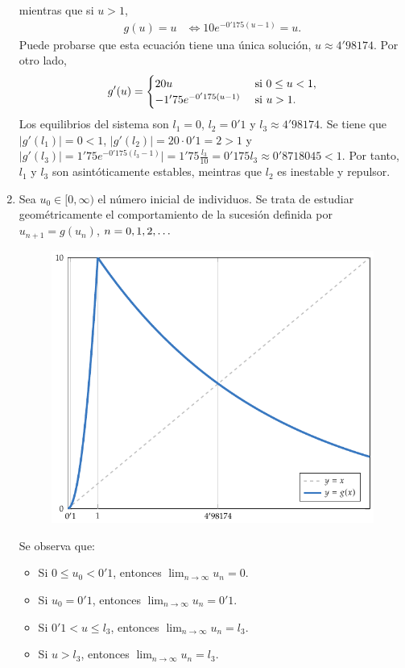 \documentclass[11pt]{report}
\begin{document}
\begin{solution}
\begin{enumerate}
        mientras que si $u > 1$,
        \begin{align*}
            g(u) = u &\iff 10e^{-0'175(u-1)} = u.
        \end{align*}
        Puede probarse que esta ecuación tiene una única solución, $u \approx 4'98174$. Por otro lado,
        \[g'(u) = \begin{cases}
            20u & $ si $ 0 \leq u < 1, \\
            -1'75e^{-0'175(u-1)} & $ si $ u > 1.
        \end{cases}\]
        Los equilibrios del sistema son $l_1 = 0$, $l_2 = 0'1$ y $l_3 \approx 4'98174$. Se tiene que $|g'(l_1)| = 0 < 1$, $|g'(l_2)| = 20\cdot 0'1 = 2 > 1$ y $|g'(l_3)| = 1'75e^{-0'175(l_3-1)}| = 1'75\frac{l_3}{10} = 0'175l_3 \approx 0'8718045 < 1$. Por tanto, $l_1$ y $l_3$ son asintóticamente estables, meintras que $l_2$ es inestable y repulsor.
        \item Sea $u_0 \in [0,\infty)$ el número inicial de individuos. Se trata de estudiar geométricamente el comportamiento de la sucesión definida por $u_{n+1} = g(u_n)$, $n = 0,1,2,\mathellipsis$
        \begin{figure}[H]
            \centering
            \includegraphics{./plot5/main.pdf}
        \end{figure}
        Se observa que:
        \begin{itemize}
            \item Si $0 \leq u_0 < 0'1$, entonces $\lim_{n\to\infty} u_n = 0$.
            \item Si $u_0 = 0'1$, entonces $\lim_{n\to\infty} u_n = 0'1$.
            \item Si $0'1 < u \leq l_3$, entonces $\lim_{n\to\infty} u_n = l_3$.
            \item Si $u > l_3$, entonces $\lim_{n\to\infty} u_n = l_3$.
        \end{itemize}
    \end{enumerate}
\end{solution}
\end{document}
